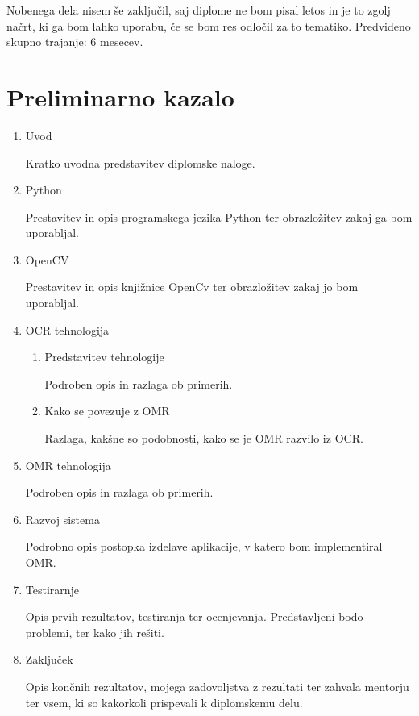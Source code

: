 \documentclass[11pt,a4paper]{article}
\begin{document}
Nobenega dela nisem še zaključil, saj diplome ne bom pisal letos in je to zgolj načrt, ki ga bom lahko uporabu, če se bom res odločil za to tematiko. Predvideno skupno trajanje: 6 mesecev.

\section{Preliminarno kazalo}

\begin{enumerate}
\item Uvod

Kratko uvodna predstavitev diplomske naloge.
\item Python

Prestavitev in opis programskega jezika Python ter obrazložitev zakaj ga bom uporabljal.

\item OpenCV

Prestavitev in opis knjižnice OpenCv ter obrazložitev zakaj jo bom uporabljal.

\item OCR tehnologija
\begin{enumerate}
\item Predstavitev tehnologije

Podroben opis in razlaga ob primerih.

\item Kako se povezuje z OMR

Razlaga, kakšne so podobnosti, kako se je OMR razvilo iz OCR.
\end{enumerate}
\item OMR tehnologija

Podroben opis in razlaga ob primerih.

\item Razvoj sistema

Podrobno opis postopka izdelave aplikacije, v katero bom implementiral OMR.

\item Testirarnje

Opis prvih rezultatov, testiranja ter ocenjevanja. Predstavljeni bodo problemi, ter kako jih rešiti.

\item Zaključek

Opis končnih rezultatov, mojega zadovoljstva z rezultati ter zahvala mentorju ter vsem, ki so kakorkoli prispevali k diplomskemu delu.
\end{enumerate}




\end{document}
